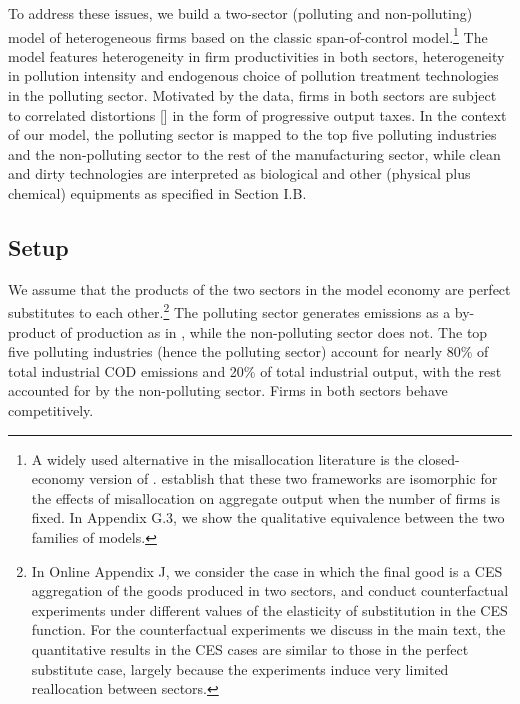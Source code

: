 \documentclass[AEJ]{AEA}
\begin{document}
To address these issues, we build a two-sector (polluting and non-polluting) model of heterogeneous firms based on the classic \citet{Lucas:1978b} span-of-control model.\footnote{A widely used alternative  in the misallocation literature is the closed-economy version of \citet{Melitz:2003}. \citet{HsiehKlenow:2009} establish that these two frameworks are isomorphic for the effects of misallocation on aggregate output when the number of firms is fixed. In Appendix G.3, we show the qualitative equivalence between the two families of models.} The model features heterogeneity in firm productivities in both sectors, heterogeneity in pollution intensity and endogenous choice of pollution treatment technologies in the polluting sector. Motivated by the data, firms in both sectors are subject to correlated distortions [\citet{RestucciaRogerson:2008}] in the form of progressive output taxes. %
In the context of our model, the polluting sector is mapped to the top five polluting industries and the non-polluting sector to the rest of the manufacturing sector, while clean and dirty technologies are interpreted as biological and other (physical plus chemical) equipments as specified in Section I.B.

\subsection{Setup}

We assume that the products of the two sectors in the model economy are perfect substitutes to each other.\footnote{In Online Appendix J, we consider the case in which the final good is a CES aggregation of the goods produced in two sectors, and conduct counterfactual experiments under different values of the elasticity of substitution in the CES function. For the counterfactual experiments we discuss in the main text, the quantitative results in the CES cases are similar to those in the perfect substitute case, largely because the experiments induce very limited reallocation between sectors.} The polluting sector generates emissions as a by-product of production as in \citet{CopelandTaylor:1994}, while the non-polluting sector does not. The top five polluting industries (hence the polluting sector) account for nearly 80\% of total industrial COD emissions and 20\% of total industrial output, with the rest accounted for by the non-polluting sector. Firms in both sectors behave competitively.
\end{document}
